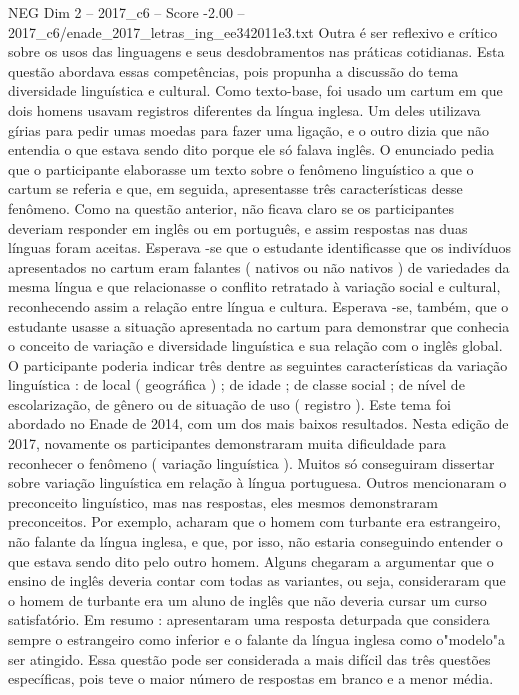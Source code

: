\begin{textsample}{NEG Dim 2 – 2017\_c6 – Score -2.00 – 2017\_c6/enade\_2017\_letras\_ing\_ee342011e3.txt}
Outra é ser reflexivo e crítico sobre os usos das linguagens e seus desdobramentos nas práticas cotidianas.
Esta questão abordava essas competências, pois propunha a discussão do tema diversidade linguística e cultural.
Como texto-base, foi usado um cartum em que dois homens usavam registros diferentes da língua inglesa.
Um deles utilizava gírias para pedir umas moedas para fazer uma ligação, e o outro dizia que não entendia o que estava sendo dito porque ele só falava inglês.
O enunciado pedia que o participante elaborasse um texto sobre o fenômeno linguístico a que o cartum se referia e que, em seguida, apresentasse três características desse fenômeno.
Como na questão anterior, não ficava claro se os participantes deveriam responder em inglês ou em português, e assim respostas nas duas línguas foram aceitas.
Esperava -se que o estudante identificasse que os indivíduos apresentados no cartum eram falantes ( nativos ou não nativos ) de variedades da mesma língua e que relacionasse o conflito retratado à variação social e cultural, reconhecendo assim a relação entre língua e cultura.
Esperava -se, também, que o estudante usasse a situação apresentada no cartum para demonstrar que conhecia o conceito de variação e diversidade linguística e sua relação com o inglês global.
O participante poderia indicar três dentre as seguintes características da variação linguística : de local ( geográfica ) ; de idade ; de classe social ; de nível de escolarização, de gênero ou de situação de uso ( registro ).
Este tema foi abordado no Enade de 2014, com um dos mais baixos resultados.
Nesta edição de 2017, novamente os participantes demonstraram muita dificuldade para reconhecer o fenômeno ( variação linguística ).
Muitos só conseguiram dissertar sobre variação linguística em relação à língua portuguesa.
Outros mencionaram o preconceito linguístico, mas nas respostas, eles mesmos demonstraram preconceitos.
Por exemplo, acharam que o homem com turbante era estrangeiro, não falante da língua inglesa, e que, por isso, não estaria conseguindo entender o que estava sendo dito pelo outro homem.
Alguns chegaram a argumentar que o ensino de inglês deveria contar com todas as variantes, ou seja, consideraram que o homem de turbante era um aluno de inglês que não deveria cursar um curso satisfatório.
Em resumo : apresentaram uma resposta deturpada que considera sempre o estrangeiro como inferior e o falante da língua inglesa como o"modelo"a ser atingido.
Essa questão pode ser considerada a mais difícil das três questões específicas, pois teve o maior número de respostas em branco e a menor média.

\end{textsample}
